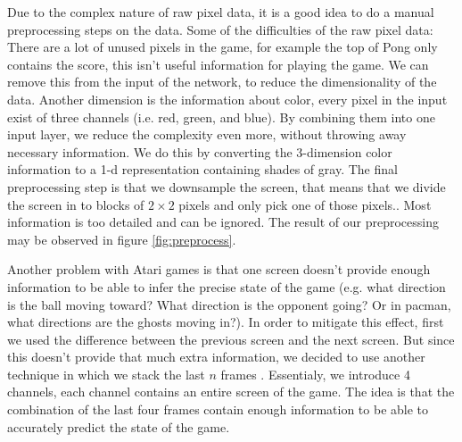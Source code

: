 \documentclass{article}
\begin{document}
Due to the complex nature of raw pixel data, it is a good idea to do a manual preprocessing steps on the data. Some of the difficulties of the raw pixel data: There are a lot of unused pixels in the game, for example the top of Pong only contains the score, this isn't useful information for playing the game. We can remove this from the input of the network, to reduce the dimensionality of the data. Another dimension is the information about color, every pixel in the input exist of three channels (i.e. red, green, and blue). By combining them into one input layer, we reduce the complexity even more, without throwing away necessary information. We do this by converting the 3-dimension color information to a 1-d representation containing shades of gray. The final preprocessing step is that we downsample the screen, that means that we divide the screen in to blocks of $2\times2$ pixels and only pick one of those pixels.. Most information is too detailed and can be ignored. The result of our preprocessing may be observed in figure \ref{fig:preprocess}. 

Another problem with Atari games is that one screen doesn't provide enough information to be able to infer the precise state of the game (e.g. what direction is the ball moving toward? What direction is the opponent going? Or in pacman, what directions are the ghosts moving in?). In order to mitigate this effect, first we used the difference between the previous screen and the next screen. But since this doesn't provide that much extra information, we decided to use another technique in which we stack the last $n$ frames \cite{mnih2013playing}. Essentialy, we introduce 4 channels,  each channel contains an entire screen of the game. The idea is that the combination of the last four frames contain enough information to be able to accurately predict the state of the game.
\end{document}
